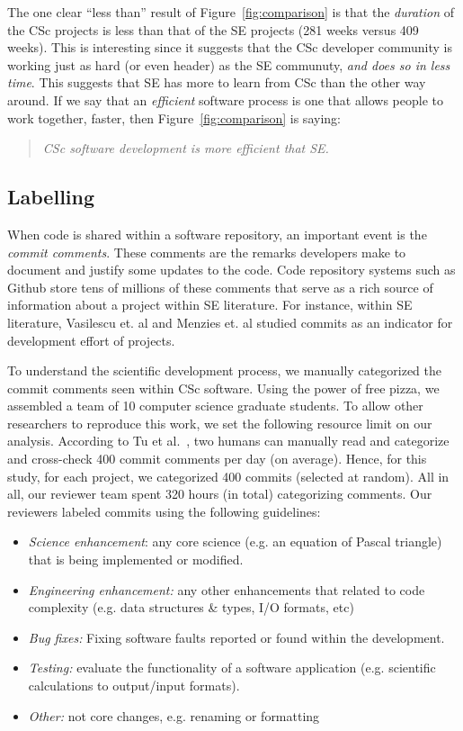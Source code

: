 \documentclass[conference,10pt]{IEEEtran}
\newcommand{\bi}{\begin{itemize}}
\newcommand{\ei}{\end{itemize}}
\begin{document}
The one clear ``less than'' result of Figure~\ref{fig:comparison} is that the {\em duration} of the CSc projects is less than that of the SE projects (281 weeks versus 409 weeks). 
This is interesting since it suggests
that the CSc developer community is working
just as hard (or even header)
as the SE communuty, {\em and does so in less time}.
This suggests that SE has more to learn from CSc than the other way around.
If we say that   an {\em efficient} software process is one that allows  people to work together, faster,  then 
Figure~\ref{fig:comparison} is saying:
\begin{quote}
{\em CSc software development is  more efficient that SE.}
\end{quote} 

     
 \subsection{Labelling}
 When code is shared
within a software repository, an important event is the {\em commit comments}. These comments are the remarks developers make to document and justify some updates to the code. Code repository systems such as Github store tens of millions of these comments that serve as a rich source of information about a project within SE literature. For instance, within SE literature,  Vasilescu et. al \cite{vasilescu16_limit} and Menzies et. al \cite{xia2019sequential} studied commits as an indicator for development effort of projects.


To understand the scientific development process, we manually categorized the commit comments seen within CSc
software. 
Using the power of free pizza, we assembled a team of 10 computer science 
graduate students.
To allow other researchers to reproduce this work, we set
the following
resource limit on our analysis.
According to Tu et al.~\cite{tu2019better}, two humans can manually read and categorize
and cross-check 400 commit comments per day (on average).
Hence, for this study, for each project, we categorized 400 commits
(selected at random). 
All in all, our
reviewer team spent 320 hours (in total) categorizing comments. Our  reviewers
labeled commits using the following
guidelines:
\bi
\item {\em Science enhancement}: any core science (e.g. an equation of Pascal triangle) that is being implemented or modified.
\item {\em Engineering enhancement:} any other enhancements that related to code complexity (e.g. data structures \& types, I/O formats, etc) 
\item {\em Bug fixes:} Fixing software faults reported or found within the development. 
\item {\em Testing: } evaluate the functionality of a software application (e.g. scientific calculations to output/input formats).
\item
{\em Other:} not core changes, e.g. renaming or formatting 
\ei
\end{document}
